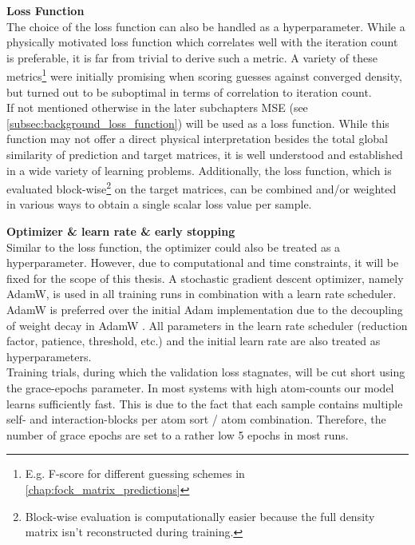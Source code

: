 \textbf{Loss Function}\\
The choice of the loss function can also be handled as a hyperparameter. While a physically motivated loss function which correlates well with the iteration count is preferable, it is far from trivial to derive such a metric. A variety of these metrics\footnote{E.g. F-score for different guessing schemes in \autoref{chap:fock_matrix_predictions}} were initially promising when scoring guesses against converged density, but turned out to be suboptimal in terms of correlation to iteration count. \\
If not mentioned otherwise in the later subchapters MSE (see \autoref{subsec:background_loss_function}) will be used as a loss function. While this function may not offer a direct physical interpretation besides the total global similarity of prediction and target matrices, it is well understood and established in a wide variety of learning problems. Additionally, the loss function, which is evaluated block-wise\footnote{Block-wise evaluation is computationally easier because the full density matrix isn't reconstructed during training.} on the target matrices, can be combined and/or weighted in various ways to obtain a single scalar loss value per sample. 

\textbf{Optimizer \& learn rate \& early stopping}\\
Similar to the loss function, the optimizer could also be treated as a hyperparameter. However, due to computational and time constraints, it will be fixed for the scope of this thesis. A stochastic gradient descent optimizer, namely AdamW, is used in all training runs in combination with a learn rate scheduler. AdamW is preferred over the initial Adam implementation due to the decoupling of weight decay in AdamW \parencite{ref:adamW}. All parameters in the learn rate scheduler (reduction factor, patience, threshold, etc.) and the initial learn rate are also treated as hyperparameters. \\
Training trials, during which the validation loss stagnates, will be cut short using the grace-epochs parameter. In most systems with high atom-counts our model learns sufficiently fast. This is due to the fact that each sample contains multiple self- and interaction-blocks per atom sort / atom combination. Therefore, the number of grace epochs are set to a rather low 5 epochs in most runs. 

